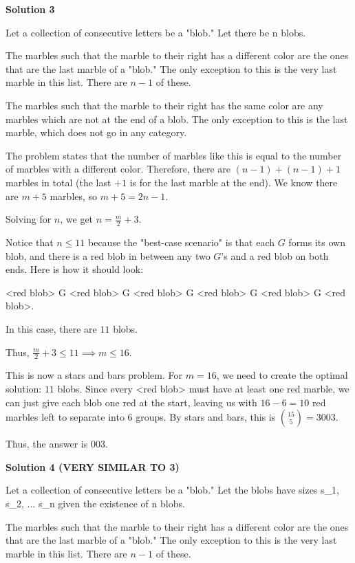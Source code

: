 \begin{enumerate}
 



\textbf{Solution 3}

Let a collection of consecutive letters be a "blob."  Let there be n blobs.

 The marbles such that the marble to their right has a different color are the ones that are the last marble of a "blob."  The only exception to this is the very last marble in this list. There are \( n-1 \) of these.  

 The marbles such that the marble to their right has the same color are any marbles which are not at the end of a blob.  The only exception to this is the last marble, which does not go in any category.  

 The problem states that the number of marbles like this is equal to the number of marbles with a different color.  Therefore, there are \( (n-1) + (n-1) + 1 \) marbles in total (the last \( +1 \) is for the last marble at the end).  We know there are \( m+5 \) marbles, so \( m+5 = 2n-1 \).  

 Solving for \( n \), we get \( n = \frac{m}{2} + 3 \).  

 Notice that \( n \leq 11 \) because the "best-case scenario" is that each \( G \) forms its own blob, and there is a red blob in between any two \( G \)'s and a red blob on both ends.  Here is how it should look:  

 <red blob> G <red blob> G <red blob> G <red blob> G <red blob> G <red blob>.

 
In this case, there are \( 11 \) blobs.  

 Thus, \( \frac{m}{2} + 3 \leq 11 \implies m \leq 16 \).  

 This is now a stars and bars problem. For \( m = 16 \), we need to create the optimal solution: \( 11 \) blobs.  Since every <red blob> must have at least one red marble, we can just give each blob one red at the start, leaving us with \( 16-6 = 10 \) red marbles left to separate into \( 6 \) groups.  By stars and bars, this is \( \binom{15}{5} = 3003 \).  

 Thus, the answer is \( \boxed{003} \).

 



\textbf{Solution 4 (VERY SIMILAR TO 3)}

Let a collection of consecutive letters be a "blob."  Let the blobs have sizes s\_1, s\_2, ... s\_n given the existence of n blobs.

 The marbles such that the marble to their right has a different color are the ones that are the last marble of a "blob."  The only exception to this is the very last marble in this list. There are \( n-1 \) of these.  


\end{enumerate}
